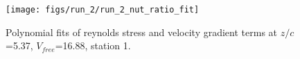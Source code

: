 \begin{figure}[H]
\centering
\texttt{[image: figs/run\_2/run\_2\_nut\_ratio\_fit]}
\caption{Polynomial fits of reynolds stress and velocity gradient terms at $z/c$=5.37, $V_{free}$=16.88, station 1.}
\label{fig:run_2_nut_ratio_fit}
\end{figure}


